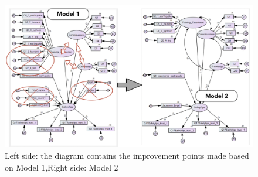 \begin{figure}[h]
  \includegraphics[width=\linewidth]{Figure/Figure25.png}
  \centering
  \caption[SEM model 2]{Left side: the diagram contains the improvement points made based on Model 1,Right side: Model 2}
  \label{fig25}
\end{figure}


